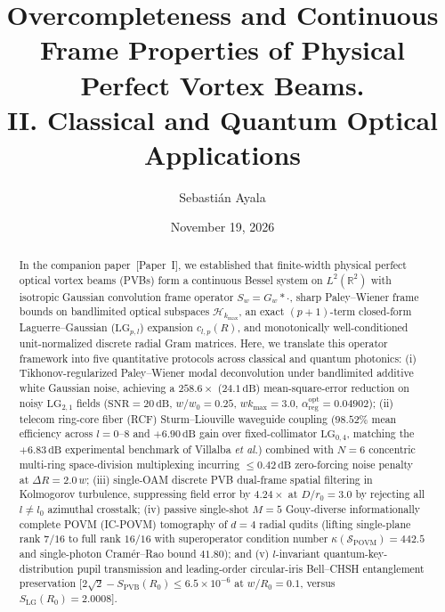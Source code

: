 \documentclass[aps,pra,reprint,nofootinbib,floatfix,longbibliography]{revtex4-2}
\begin{document}
\title{Overcompleteness and Continuous Frame Properties of Physical Perfect Vortex Beams.\\II. Classical and Quantum Optical Applications}

\author{Sebasti\'an Ayala}

\date{November 19, 2026}

\begin{abstract}
In the companion paper~[Paper~I], we established that finite-width physical perfect optical vortex beams (PVBs) form a continuous Bessel system on $L^2(\mathbb{R}^2)$ with isotropic Gaussian convolution frame operator $S_w = G_w * \cdot$, sharp Paley--Wiener frame bounds on bandlimited optical subspaces $\mathcal{H}_{k_{\max}}$, an exact $(p+1)$-term closed-form Laguerre--Gaussian ($\mathrm{LG}_{p,l}$) expansion $c_{l,p}(R)$, and monotonically well-conditioned unit-normalized discrete radial Gram matrices. Here, we translate this operator framework into five quantitative protocols across classical and quantum photonics: (i) Tikhonov-regularized Paley--Wiener modal deconvolution under bandlimited additive white Gaussian noise, achieving a $258.6\times$ ($24.1\,\mathrm{dB}$) mean-square-error reduction on noisy $\mathrm{LG}_{2,1}$ fields ($\mathrm{SNR} = 20\,\mathrm{dB}$, $w/w_0 = 0.25$, $w k_{\max} = 3.0$, $\alpha_{\mathrm{reg}}^{\mathrm{opt}} = 0.04902$); (ii) telecom ring-core fiber (RCF) Sturm--Liouville waveguide coupling ($98.52\%$ mean efficiency across $l = 0\text{--}8$ and $+6.90\,\mathrm{dB}$ gain over fixed-collimator $\mathrm{LG}_{0,4}$, matching the $+6.83\,\mathrm{dB}$ experimental benchmark of Villalba \emph{et al.}) combined with $N = 6$ concentric multi-ring space-division multiplexing incurring $\le 0.42\,\mathrm{dB}$ zero-forcing noise penalty at $\Delta R = 2.0\,w$; (iii) single-OAM discrete PVB dual-frame spatial filtering in Kolmogorov turbulence, suppressing field error by $4.24\times$ at $D/r_0 = 3.0$ by rejecting all $l \neq l_0$ azimuthal crosstalk; (iv) passive single-shot $M = 5$ Gouy-diverse informationally complete POVM (IC-POVM) tomography of $d = 4$ radial qudits (lifting single-plane rank $7/16$ to full rank $16/16$ with superoperator condition number $\kappa(\mathcal{S}_{\mathrm{POVM}}) = 442.5$ and single-photon Cram\'er--Rao bound $41.80$); and (v) $l$-invariant quantum-key-distribution pupil transmission and leading-order circular-iris Bell--CHSH entanglement preservation [$2\sqrt{2} - S_{\mathrm{PVB}}(R_0) \le 6.5\times 10^{-6}$ at $w/R_0 = 0.1$, versus $S_{\mathrm{LG}}(R_0) = 2.0008$].
\end{abstract}
\end{document}
